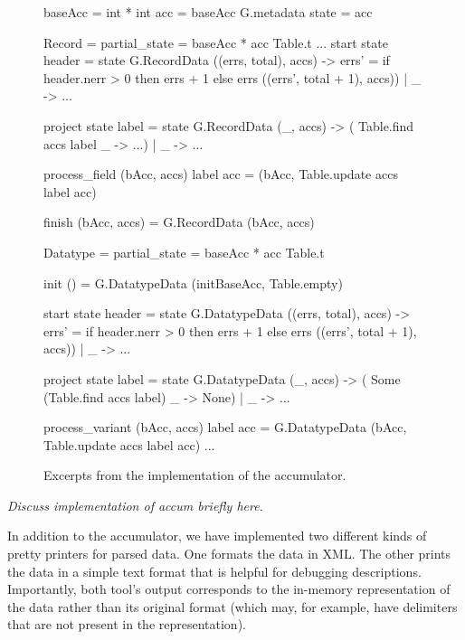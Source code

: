 \begin{figure}
\begin{code}\scriptsize
{} baseAcc = int * int
 acc = baseAcc G.metadata
 state = acc

 Record = 
   partial_state = baseAcc * acc Table.t
  ... 
   start state header =
     state 
      G.RecordData ((errs, total), accs) ->
	 errs' = if header.nerr > 0
                    then errs + 1 else errs
	 ((errs', total + 1), accs))
    | _ ->  ...
	  
   project state label =  state 
      G.RecordData (_, accs) -> ( Table.find accs label
                                  _ ->  ...)
    | _ ->  ...

   process_field (bAcc, accs) label acc =
    (bAcc, Table.update accs label acc)
      
   finish (bAcc, accs) = G.RecordData (bAcc, accs)
    
 Datatype = 
   partial_state = baseAcc * acc Table.t
	
   init () = G.DatatypeData (initBaseAcc, Table.empty)

   start state header = 
     state 
      G.DatatypeData ((errs, total), accs) ->
	 errs' = if header.nerr > 0
                    then errs + 1 else errs
	 ((errs', total + 1), accs))
    | _ ->  ...
	  
   project state label =  state 
    G.DatatypeData (_, accs) -> ( Some (Table.find accs label)
                                  _ -> None)
  | _ ->  ...
	  
   process_variant (bAcc, accs) label acc =
    G.DatatypeData (bAcc, Table.update accs label acc)
...
\end{code}
\caption{Excerpts from the implementation of the accumulator.}
\label{fig:gentool-accum-code}
\end{figure}

\emph{Discuss implementation of accum briefly here.}

In addition to the accumulator, we have implemented two different
kinds of pretty printers for parsed data.  One formats the data in
XML. The other prints the data in a simple text format that is helpful
for debugging descriptions. Importantly, both tool's output corresponds to the in-memory
representation of the data rather than its original format (which may,
for example, have delimiters that are not present in the
representation).

